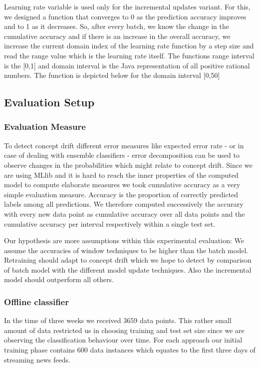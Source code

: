 \documentclass{article} %
\begin{document}
Learning rate variable is used only for the incremental updates variant. For this, we designed a function that converges to 0 as the prediction accuracy improves and to 1 as it decreases. So, after every batch, we know the change in the cumulative accuracy and if there is an increase in the overall accuracy, we increase the current domain index of the learning rate function by a step size and read the range value which is the learning rate itself. The functions range interval is the [0,1] and domain interval is the Java representation of all positive rational numbers. The function is depicted below for the domain interval [0,50]



\subsection{Evaluation Setup}


\subsubsection*{Evaluation Measure}

To detect concept drift different error measures like expected error rate - or in case of dealing with ensemble classifiers - error decomposition can be used to observe changes in the probabilities which might relate to concept drift.\cite{Gao07ageneral}  Since we are using MLlib and it is hard to reach the inner properties of the computed model to compute elaborate measures we took cumulative accuracy as a very simple evaluation measure.  Accuracy is the  proportion of correctly predicted labels among all predictions. We therefore computed  successively the accurary with every new data point as cumulative accuracy over all data points and the cumulative accuracy per interval respectively within a single test set.

Our hypothesis are more assumptions within this experimental evaluation: We assume the accuracies of window techniques to be higher than the batch model. Retraining should adapt to concept drift which we hope to detect by comparison of batch model with the different model update techniques. Also the incremental model should outperform all others.

\subsubsection*{Offline classifier}
In the time of three weeks we received 3659 data points. This rather small amount of data restricted us in choosing training and test set size since we are observing the classification behaviour over time. For each approach our initial training phase contains 600 data instances which equates to the first three days of streaming news feeds. 
\end{document}
